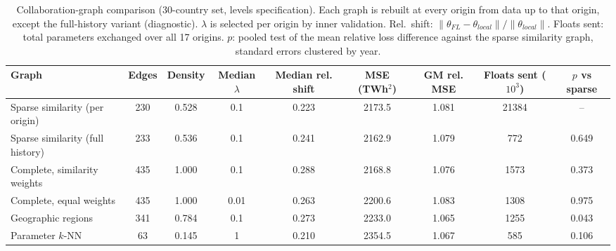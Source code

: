 \begin{table}[htbp]
\centering
\caption{Collaboration-graph comparison (30-country set, levels specification). Each graph is rebuilt at every origin from data up to that origin, except the full-history variant (diagnostic). $\lambda$ is selected per origin by inner validation. Rel.\ shift: $\|\theta_{FL}-\theta_{local}\|/\|\theta_{local}\|$. Floats sent: total parameters exchanged over all 17 origins. $p$: pooled test of the mean relative loss difference against the sparse similarity graph, standard errors clustered by year.}
\label{tab:graphs}
\begin{tabular}{lcccccccc}
\toprule
Graph & Edges & Density & Median $\lambda$ & Median rel. shift & MSE (TWh$^2$) & GM rel. MSE & Floats sent ($10^3$) & $p$ vs sparse \\
\midrule
Sparse similarity (per origin) & 230 & 0.528 & 0.1 & 0.223 & 2173.5 & 1.081 & 21384 & -- \\
Sparse similarity (full history) & 233 & 0.536 & 0.1 & 0.241 & 2162.9 & 1.079 & 772 & 0.649 \\
Complete, similarity weights & 435 & 1.000 & 0.1 & 0.288 & 2168.8 & 1.076 & 1573 & 0.373 \\
Complete, equal weights & 435 & 1.000 & 0.01 & 0.263 & 2200.6 & 1.083 & 1308 & 0.975 \\
Geographic regions & 341 & 0.784 & 0.1 & 0.273 & 2233.0 & 1.065 & 1255 & 0.043 \\
Parameter $k$-NN & 63 & 0.145 & 1 & 0.210 & 2354.5 & 1.067 & 585 & 0.106 \\
\bottomrule
\end{tabular}
\end{table}

